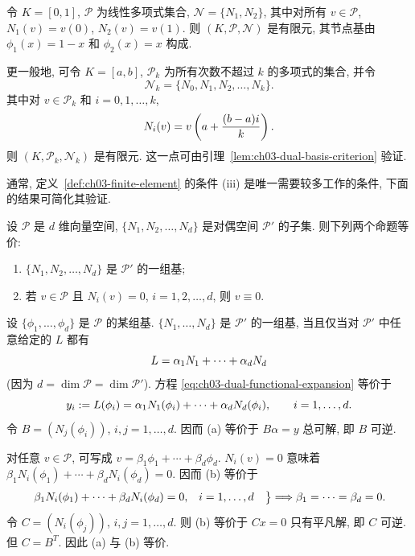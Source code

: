 \begin{Example}[一维 Lagrange 单元]
\label{ex:ch03-one-dimensional-lagrange}
令 $K=[0,1]$, $\mathcal P$ 为线性多项式集合, $\mathcal N=\{N_1,N_2\}$, 其中对所有 $v\in\mathcal P$, $N_1(v)=v(0)$, $N_2(v)=v(1)$. 则 $(K,\mathcal P,\mathcal N)$ 是有限元, 其节点基由 $\phi_1(x)=1-x$ 和 $\phi_2(x)=x$ 构成.

更一般地, 可令 $K=[a,b]$, $\mathcal P_k$ 为所有次数不超过 $k$ 的多项式的集合, 并令
\[
\mathcal N_k=\{N_0,N_1,N_2,\ldots,N_k\}.
\]
其中对 $v\in\mathcal P_k$ 和 $i=0,1,\ldots,k$,
\[
\MathBookFormulaID{formula-ch03-one-dimensional-nodal-values}
N_i(v)=v\left(a+\frac{(b-a)i}{k}\right).
\]
则 $(K,\mathcal P_k,\mathcal N_k)$ 是有限元. 这一点可由引理~\ref{lem:ch03-dual-basis-criterion} 验证.
\end{Example}

通常, 定义~\ref{def:ch03-finite-element} 的条件 (iii) 是唯一需要较多工作的条件, 下面的结果可简化其验证.

\begin{Lemma}
\label{lem:ch03-dual-basis-criterion}
设 $\mathcal P$ 是 $d$ 维向量空间, $\{N_1,N_2,\ldots,N_d\}$ 是对偶空间 $\mathcal P'$ 的子集. 则下列两个命题等价:
\begin{enumerate}
\item[(a)] $\{N_1,N_2,\ldots,N_d\}$ 是 $\mathcal P'$ 的一组基;
\item[(b)] 若 $v\in\mathcal P$ 且 $N_i(v)=0$, $i=1,2,\ldots,d$, 则 $v\equiv0$.
\end{enumerate}
\end{Lemma}

\begin{Proof}
设 $\{\phi_1,\ldots,\phi_d\}$ 是 $\mathcal P$ 的某组基. $\{N_1,\ldots,N_d\}$ 是 $\mathcal P'$ 的一组基, 当且仅当对 $\mathcal P'$ 中任意给定的 $L$ 都有
\setcounter{equation}{4}
\begin{equation}
\MathBookFormulaID{formula-ch03-dual-functional-expansion}
L=\alpha_1N_1+\cdots+\alpha_dN_d
\label{eq:ch03-dual-functional-expansion}
\end{equation}
(因为 $d=\dim\mathcal P=\dim\mathcal P'$). 方程 \eqref{eq:ch03-dual-functional-expansion} 等价于
\[
\MathBookFormulaID{formula-ch03-dual-functional-linear-system}
y_i:=L(\phi_i)=\alpha_1N_1(\phi_i)+\cdots+\alpha_dN_d(\phi_i),
\qquad i=1,\ldots,d.
\]
令 $B=(N_j(\phi_i))$, $i,j=1,\ldots,d$. 因而 (a) 等价于 $B\alpha=y$ 总可解, 即 $B$ 可逆.

对任意 $v\in\mathcal P$, 可写成 $v=\beta_1\phi_1+\cdots+\beta_d\phi_d$. $N_i(v)=0$ 意味着 $\beta_1N_i(\phi_1)+\cdots+\beta_dN_i(\phi_d)=0$. 因而 (b) 等价于
\begin{equation}
\MathBookFormulaID{formula-ch03-primal-linear-system}
\left.
\begin{aligned}
\beta_1N_i(\phi_1)+\cdots+\beta_dN_i(\phi_d)&=0,
&&i=1,\ldots,d
\end{aligned}
\right\}
\Longrightarrow\beta_1=\cdots=\beta_d=0.
\label{eq:ch03-primal-linear-system}
\end{equation}
令 $C=(N_i(\phi_j))$, $i,j=1,\ldots,d$. 则 (b) 等价于 $Cx=0$ 只有平凡解, 即 $C$ 可逆. 但 $C=B^T$. 因此 (a) 与 (b) 等价.
\end{Proof}

